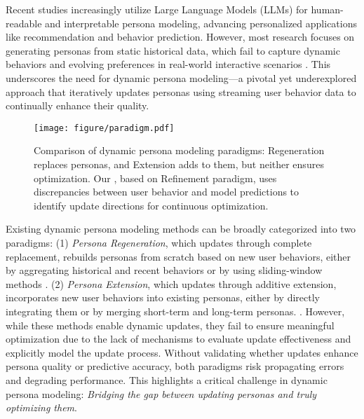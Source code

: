 

Recent studies increasingly utilize Large Language Models (LLMs) \cite{achiam2023gpt, anthropic2024claude3, llama3modelcard} for human-readable and interpretable persona modeling, advancing personalized applications like recommendation and behavior prediction. However, most research focuses on generating personas from static historical data, which fail to capture dynamic behaviors and evolving preferences in real-world interactive scenarios \cite{ wang2023zero, zhou2024language}. This underscores the need for dynamic persona modeling—a pivotal yet underexplored approach that iteratively updates personas using streaming user behavior data to continually enhance their quality.

\begin{figure}[t]
    \centering
    \texttt{[image: figure/paradigm.pdf]}
    \caption{Comparison of dynamic persona modeling paradigms: Regeneration replaces personas, and Extension adds to them, but neither ensures optimization. Our \method, based on Refinement paradigm, uses discrepancies between user behavior and model predictions to identify update directions for continuous optimization.}
    \label{fig:paradigm}
\end{figure}


Existing dynamic persona modeling methods can be broadly categorized into two paradigms: 
(1) \textit{Persona Regeneration}, which updates through complete replacement, rebuilds personas from scratch based on new user behaviors, either by aggregating historical and recent behaviors or by using sliding-window methods \cite{zhou2024language, wu2024rlpf, yang2023palr, xi2024towards}. 
(2) \textit{Persona Extension}, which updates through additive extension, incorporates new user behaviors into existing personas, either by directly integrating them or by merging short-term and long-term personas. \cite{lian2022incremental,liu2024once, tang2023enhancing,yin2023heterogeneous,yuan2024evaluating}.  
However, while these methods enable dynamic updates, they fail to ensure meaningful optimization due to the lack of mechanisms to evaluate update effectiveness and explicitly model the update process. Without validating whether updates enhance persona quality or predictive accuracy, both paradigms risk propagating errors and degrading performance. This highlights a critical challenge in dynamic persona modeling: \textit{Bridging the gap between updating personas and truly optimizing them}.



